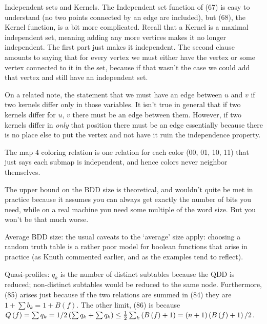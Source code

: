 
\noindent [p231] Independent sets and Kernels.  The Independent
set function of (67) is easy to understand (no two points connected
by an edge are included), but (68), the Kernel function, is a bit
more complicated.  Recall that a Kernel is a maximal independent set,
meaning adding any more vertices makes it no longer independent.
The first part just makes it independent.  The second clause amounts
to saying that for every vertex we must either have the vertex or
some vertex connected to it in the set, because if that wasn't the case 
we could add that vertex and still have an independent set.

On a related note, the statement that we must have an edge between
$u$ and $v$ if two kernels differ only in those variables.  It isn't
true in general that if two kernels differ for $u$, $v$ there must be 
an edge between them. However, if two kernels differ in {\it only} that
position there must be an edge essentially because there is no place
else to put the vertex and not have it ruin the independence property.


\noindent [p 233] The map 4 coloring relation is one relation
for each color (00, 01, 10, 11) that just says each submap
is independent, and hence colors never neighbor themselves.


\noindent [p 234] The upper bound on the BDD size is theoretical,
and wouldn't quite be met in practice because it assumes you
can always get exactly the number of bits you need, while
on a real machine you need some multiple of the word size.
But you won't be that much worse.

 Average BDD size: the usual
caveats to the `average' size apply: choosing a random truth
table is a rather poor model for boolean functions that arise
in practice (as Knuth commented earlier, and as the examples
tend to reflect).

 Quasi-profiles: $q_k$ is the
number of distinct subtables because the QDD is reduced;
non-distinct subtables would be reduced to the same node.
Furthermore, (85)  arises just because if the two relations
are summed in (84) they are $1 + \sum b_k = 1 + B\left(f\right)$.
The other limit, (86) is because
$Q\left(f\right) = \sum q_k =
1/2 \left(\sum q_k + \sum q_k\right)
\le {1 \over 2} \sum_k \left(B\left(f\right) + 1\right) = \left(n + 1\right)
\left(B\left(f\right) + 1\right) / 2$.

